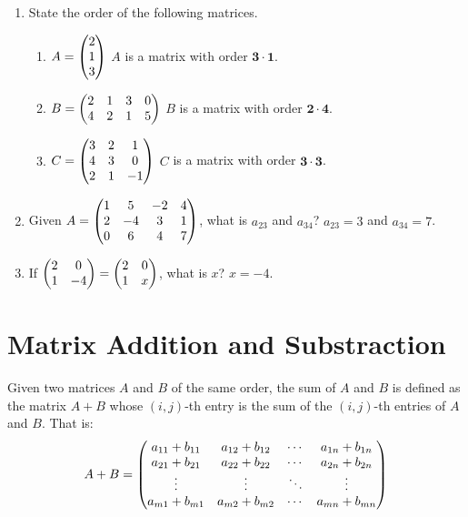 \documentclass{report}
\begin{document}
\begin{multicols}{2}
  \begin{enumerate}
    \item State the order of the following matrices.

          \begin{enumerate}

            \item $A = \begin{pmatrix}
                      2 \\
                      1 \\
                      3
                    \end{pmatrix}$
                  \sol{}
                  $A$ is a matrix with order $\mathbf{3 \cdot 1}$.

            \item $B = \begin{pmatrix}
                      2 & 1 & 3 & 0 \\
                      4 & 2 & 1 & 5
                    \end{pmatrix}$
                  \sol{}
                  $B$ is a matrix with order $\mathbf{2 \cdot 4}$.

            \item $C = \begin{pmatrix}
                      3 & 2 & 1  \\
                      4 & 3 & 0  \\
                      2 & 1 & -1
                    \end{pmatrix}$
                  \sol{}
                  $C$ is a matrix with order $\mathbf{3 \cdot 3}$.

          \end{enumerate}

    \item Given $A = \begin{pmatrix} 1 & 5 & -2 & 4 \\ 2 & -4 & 3 & 1 \\ 0 & 6 & 4 & 7 \end{pmatrix}$, what is
          $a_{23}$ and $a_{34}$? \sol{} $a_{23} = 3$ and $a_{34} = 7$.

    \item If $\begin{pmatrix} 2 & 0 \\ 1 & -4 \end{pmatrix} = \begin{pmatrix} 2 & 0 \\ 1 & x \end{pmatrix}$, what is $x$? \sol{} $x =
            -4$.
  \end{enumerate}

  \section{Matrix Addition and Substraction}

  \doublespacing{}

  Given two matrices $A$ and $B$ of the same order, the sum of $A$ and $B$ is
  defined as the matrix $A + B$ whose $(i, j)$-th entry is the sum of the $(i,
    j)$-th entries of $A$ and $B$. That is: \[A + B = \begin{pmatrix}
      a_{11} + b_{11} & a_{12} + b_{12} & \cdots & a_{1n} + b_{1n} \\
      a_{21} + b_{21} & a_{22} + b_{22} & \cdots & a_{2n} + b_{2n} \\
      \vdots          & \vdots          & \ddots & \vdots          \\
      a_{m1} + b_{m1} & a_{m2} + b_{m2} & \cdots & a_{mn} + b_{mn}
    \end{pmatrix}\]


\end{multicols}
\end{document}
